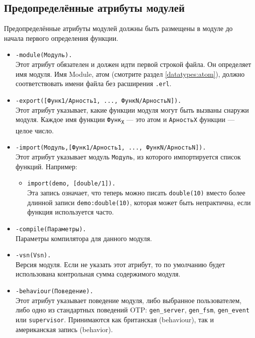 \subsection{Предопределённые атрибуты модулей}
Предопределённые атрибуты модулей должны быть размещены в модуле до начала первого
определения функции.

\begin{itemize}

	\item \verb|-module(Модуль).|\hfill\\
	Этот атрибут обязателен и должен идти первой строкой файла. Он определяет имя
	модуля. Имя Module, атом (смотрите раздел \ref{datatypes:atom}),
    должно соответствовать имени файла без расширения \texttt{.erl}.

	\item \verb|-export([Функ1/Арность1, ..., ФункN/АрностьN]).|\hfill\\
	Этот атрибут указывает, какие функции модуля могут быть вызваны снаружи 
	модуля. Каждое имя функции \texttt{Функ\textsubscript{X}} --- это атом и 
	\texttt{АрностьX} функции --- целое число.

	\item \verb|-import(Модуль,[Функ1/Арность1, ..., ФункN/АрностьN]).|\hfill\\
	Этот атрибут указывает модуль \texttt{Модуль}, из которого импортируется список
	функций. Например:

	\begin{itemize}
	\item \verb|import(demo, [double/1]).|\hfill\\
	Эта запись означает, что теперь можно писать \texttt{double(10)} вместо более
	длинной записи \texttt{demo:double(10)}, которая может быть непрактична, если
	функция используется часто.
	\end{itemize}

	\item \verb|-compile(Параметры).|\hfill\\
	Параметры компилятора для данного модуля.

	\item \verb|-vsn(Vsn).|\hfill\\
	Версия модуля. Если не указать этот атрибут, то по умолчанию будет использована
	контрольная сумма содержимого модуля.

	\item \verb|-behaviour(Поведение).|\hfill\\
	Этот атрибут указывает поведение модуля, либо выбранное пользователем, либо 
	одно из стандартных поведений OTP: \texttt{gen\_server}, \texttt{gen\_fsm},
	\texttt{gen\_event} или \texttt{supervisor}. Принимаются как британская 
	(behaviour), так и американская запись (behavior).
\end{itemize}



